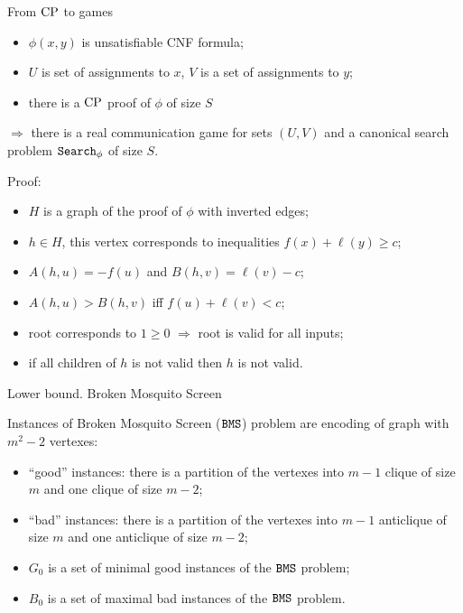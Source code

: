 \begin{frame}{From $\mathrm{CP}$ to games}

    \begin{lemma}[S 2016, unp.]
        \begin{itemize}
            \item $\phi(x, y)$ is unsatisfiable CNF formula;
            \item $U$ is set of assignments to $x$, $V$ is a set of assignments to $y$;
            \item there is a $\mathrm{CP}$ proof of $\phi$ of size $S$
        \end{itemize}
        $\Rightarrow$ there is a real communication game for sets $(U, V)$ and a canonical search problem $\mathtt{Search}_{\phi}$ of
        size $S$. 
    \end{lemma}

    \pause
    Proof:
    \pause
    \begin{itemize}
        \item $H$ is a graph of the proof of $\phi$ with inverted edges;
        \pause
        \item $h \in H$, this vertex corresponds to inequalities $f(x) + \ell(y) \ge c$;
        \pause
        \item $A(h, u) = -f(u)$ and $B(h, v) = \ell(v) - c$;
        \pause    
        \item $A(h, u) > B(h, v)$ iff $f(u) + \ell(v) < c$;
        \pause
        \item root corresponds to $1 \ge 0$ $\Rightarrow$ root is valid for all inputs;
        \pause
        \item if all children of $h$ is not valid then $h$ is not valid.
    \end{itemize}
\end{frame}

\begin{frame}{Lower bound. Broken Mosquito Screen}

    Instances of Broken Mosquito Screen ($\mathtt{BMS}$) problem are encoding of graph with $m^2 - 2$ vertexes:
    \begin{itemize}
        \pause
        \item ``good'' instances: there is a partition of the vertexes into $m - 1$ clique of size $m$ and one clique of size
            $m - 2$;
        \pause
		\item ``bad'' instances: there is a partition of the vertexes into $m - 1$ anticlique of size $m$ and one anticlique
            of size $m - 2$;
        \pause
        \item $G_0$ is a set of minimal good instances of the $\mathtt{BMS}$ problem;
        \pause
        \item $B_0$ is a set of maximal bad instances of the $\mathtt{BMS}$ problem.
    \end{itemize}

\end{frame}

